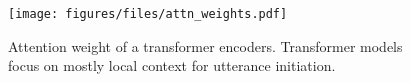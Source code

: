 \begin{figure}[t]
\centering
\texttt{[image: figures/files/attn\_weights.pdf]}
\caption{Attention weight of a transformer encoders. Transformer models focus on mostly local context for utterance initiation.}
\label{fig:attn_heatmap}
\vspace*{-1.5em}
\end{figure}

